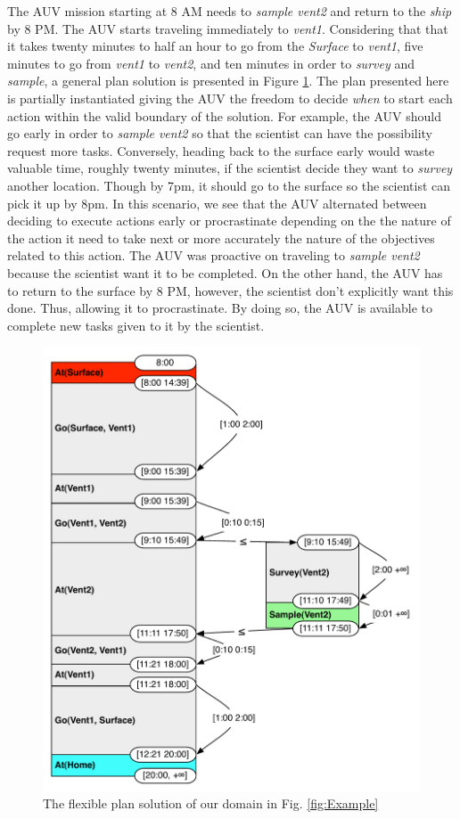 The AUV mission starting at 8 AM needs to {\em sample vent2}
and return to the {\em ship} by 8 PM. The AUV starts traveling immediately
to {\em vent1}. Considering that that it takes twenty minutes
to half an hour to go from the {\em Surface} to {\em vent1},  five minutes
to go from {\em vent1} to {\em vent2}, and ten minutes in order
to {\em survey} and {\em sample}, a general plan solution is presented in Figure
\ref{fig:ex:plan}. The plan presented here is partially instantiated
giving the AUV the freedom to decide {\em when} to start each action within
the valid boundary of the solution. For example, the AUV should go
early in order to {\em sample vent2} so that the scientist can have the possibility request 
more tasks. Conversely, heading back to the surface early would waste valuable
time, roughly twenty minutes, if the scientist decide they want to {\em survey} another location. Though by 7pm, it should
go to the surface so the scientist can pick it up by 8pm. In this scenario,
we see that the AUV alternated between deciding to execute actions
early or procrastinate depending on the the nature of the action it
need to take next or more accurately the nature of the objectives 
related to this action. The AUV was proactive on traveling to {\em sample vent2} because the
scientist want it to be completed. On the other hand, the AUV has to return to the surface by
8 PM, however, the scientist don't explicitly want this done. Thus, allowing it to procrastinate. 
By doing so, the AUV is available to complete new tasks given to it by the scientist. 


\begin{figure}
  \centering
  \includegraphics[width=0.8\columnwidth]{figs/example_plan}
  \caption{The flexible plan solution of our domain in
    Fig. \ref{fig:Example}}
  \label{fig:ex:plan}
\end{figure}

